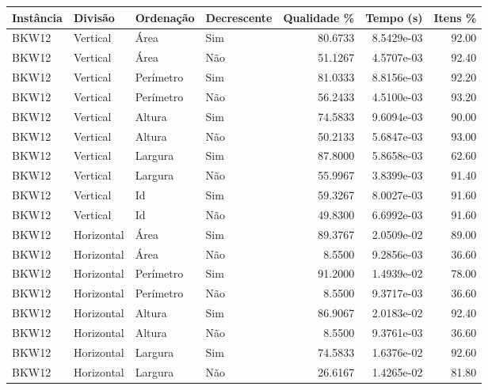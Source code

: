 \begin{tabular}{llllrrr}
    \hline
    Instância & Divisão     & Ordenação & Decrescente & Qualidade \% & Tempo (s)  & Itens \% \\
    \hline
    BKW12     & Vertical    & Área      & Sim         & 80.6733      & 8.5429e-03 & 92.00    \\
    BKW12     & Vertical    & Área      & Não         & 51.1267      & 4.5707e-03 & 92.40    \\
    BKW12     & Vertical    & Perímetro & Sim         & 81.0333      & 8.8156e-03 & 92.20    \\
    BKW12     & Vertical    & Perímetro & Não         & 56.2433      & 4.5100e-03 & 93.20    \\
    BKW12     & Vertical    & Altura    & Sim         & 74.5833      & 9.6094e-03 & 90.00    \\
    BKW12     & Vertical    & Altura    & Não         & 50.2133      & 5.6847e-03 & 93.00    \\
    BKW12     & Vertical    & Largura   & Sim         & 87.8000      & 5.8658e-03 & 62.60    \\
    BKW12     & Vertical    & Largura   & Não         & 55.9967      & 3.8399e-03 & 91.40    \\
    BKW12     & Vertical    & Id        & Sim         & 59.3267      & 8.0027e-03 & 91.60    \\
    BKW12     & Vertical    & Id        & Não         & 49.8300      & 6.6992e-03 & 91.60    \\
    BKW12     & Horizontal  & Área      & Sim         & 89.3767      & 2.0509e-02 & 89.00    \\
    BKW12     & Horizontal  & Área      & Não         & 8.5500       & 9.2856e-03 & 36.60    \\
    BKW12     & Horizontal  & Perímetro & Sim         & 91.2000      & 1.4939e-02 & 78.00    \\
    BKW12     & Horizontal  & Perímetro & Não         & 8.5500       & 9.3717e-03 & 36.60    \\
    BKW12     & Horizontal  & Altura    & Sim         & 86.9067      & 2.0183e-02 & 92.40    \\
    BKW12     & Horizontal  & Altura    & Não         & 8.5500       & 9.3761e-03 & 36.60    \\
    BKW12     & Horizontal  & Largura   & Sim         & 74.5833      & 1.6376e-02 & 92.60    \\
    BKW12     & Horizontal  & Largura   & Não         & 26.6167      & 1.4265e-02 & 81.80    \\

\end{tabular}
